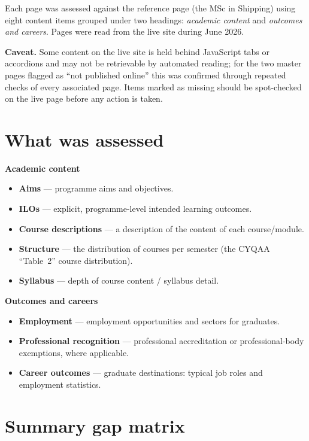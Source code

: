 \documentclass[11pt,a4paper]{article}
\begin{document}
Each page was assessed against the reference page (the MSc in Shipping) using eight content items grouped under two headings: \emph{academic content} and \emph{outcomes and careers}. Pages were read from the live site during June 2026.

\textbf{Caveat.} Some content on the live site is held behind JavaScript tabs or accordions and may not be retrievable by automated reading; for the two master pages flagged as ``not published online'' this was confirmed through repeated checks of every associated page. Items marked as missing should be spot-checked on the live page before any action is taken.

\section{What was assessed}

\textbf{Academic content}
\begin{itemize}
  \item \textbf{Aims} --- programme aims and objectives.
  \item \textbf{ILOs} --- explicit, programme-level intended learning outcomes.
  \item \textbf{Course descriptions} --- a description of the content of each course/module.
  \item \textbf{Structure} --- the distribution of courses per semester (the CYQAA ``Table~2'' course distribution).
  \item \textbf{Syllabus} --- depth of course content / syllabus detail.
\end{itemize}

\textbf{Outcomes and careers}
\begin{itemize}
  \item \textbf{Employment} --- employment opportunities and sectors for graduates.
  \item \textbf{Professional recognition} --- professional accreditation or professional-body exemptions, where applicable.
  \item \textbf{Career outcomes} --- graduate destinations: typical job roles and employment statistics.
\end{itemize}

\section{Summary gap matrix}
\end{document}
